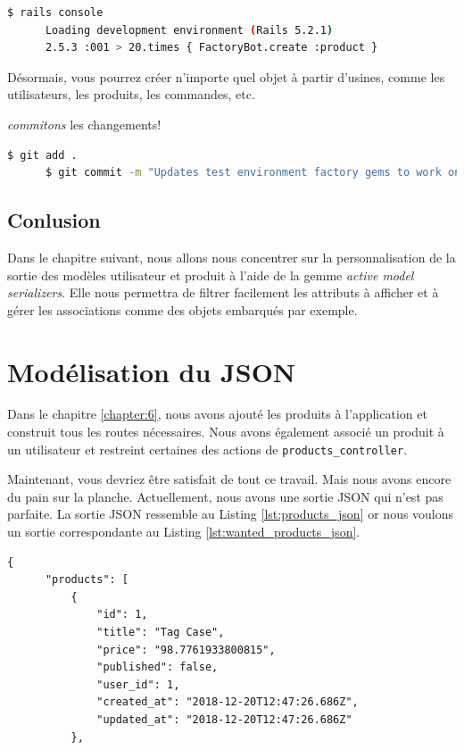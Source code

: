 \documentclass[]{report}
\begin{document}
    \begin{scriptsize}
      \begin{lstlisting}[language=bash]
      $ rails console
      Loading development environment (Rails 5.2.1)
      2.5.3 :001 > 20.times { FactoryBot.create :product }
      \end{lstlisting}
    \end{scriptsize}

    Désormais, vous pourrez créer n'importe quel objet à partir d'usines, comme les utilisateurs, les produits, les commandes, etc.

    \textit{commitons} les changements!

    \begin{scriptsize}
      \begin{lstlisting}[language=bash]
      $ git add .
      $ git commit -m "Updates test environment factory gems to work on development"
      \end{lstlisting}
    \end{scriptsize}

  \section{Conlusion}

    Dans le chapitre suivant, nous allons nous concentrer sur la personnalisation de la sortie des modèles utilisateur et produit à l'aide de la gemme \textit{active model serializers}. Elle nous permettra de filtrer facilement les attributs à afficher et à gérer les associations comme des objets embarqués par exemple.

\chapter{Modélisation du JSON}\label{chapter:7}

  Dans le chapitre \ref{chapter:6}, nous avons ajouté les produits à l'application et construit tous les routes nécessaires. Nous avons également associé un produit à un utilisateur et restreint certaines des actions de \verb|products_controller|.

  Maintenant, vous devriez être satisfait de tout ce travail. Mais nous avons encore du pain sur la planche. Actuellement, nous avons une sortie JSON qui n'est pas parfaite. La sortie JSON ressemble au Listing \ref{lst:products_json} or nous voulons un sortie correspondante au Listing \ref{lst:wanted_products_json}.

  \begin{scriptsize}
    \begin{lstlisting}[caption={Exemple de la sortie JSON actuelle pour la route products}, label={lst:products_json}]
    {
      "products": [
          {
              "id": 1,
              "title": "Tag Case",
              "price": "98.7761933800815",
              "published": false,
              "user_id": 1,
              "created_at": "2018-12-20T12:47:26.686Z",
              "updated_at": "2018-12-20T12:47:26.686Z"
          },
    \end{lstlisting}
  \end{scriptsize}
\end{document}
